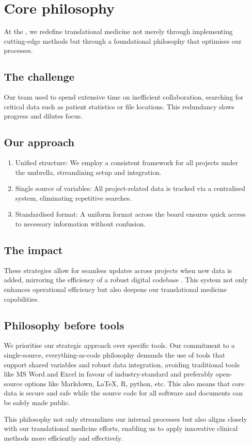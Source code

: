 \section{Core philosophy}
At the \pmu, we redefine translational medicine not merely through implementing cutting-edge methods but through a foundational philosophy that optimises our processes.


\subsection*{The challenge}
Our team used to spend extensive time on inefficient collaboration, searching for critical data such as patient statistics or file locations.
This redundancy slows progress and dilutes focus.

\subsection*{Our approach}
\begin{enumerate}
\item  Unified structure: We employ a consistent framework for all projects under the \pmu umbrella, streamlining setup and integration.
\item Single source of variables: All project-related data is tracked via a centralised system, eliminating repetitive searches.
\item Standardised format: A uniform format across the board ensures quick access to necessary information without confusion.
\end{enumerate}

\subsection*{The impact}
These strategies allow for seamless updates across projects when new data is added, mirroring the efficiency of a robust digital codebase 
\citep{potvin_levenberg_google_ACM}. 
This system not only enhances operational efficiency but also deepens our translational medicine capabilities.

\subsection*{Philosophy before tools}
We prioritise our strategic approach over specific tools. 
Our commitment to a single-source, everything-as-code philosophy demands the use of tools that support shared variables and robust data integration, avoiding traditional tools like MS Word and Excel in favour of industry-standard and preferably open-source options like Markdown, LaTeX, R, python, etc.
This also means that core data is secure and safe while the source code for all software and documents can be safely made public.

This philosophy not only streamlines our internal processes but also aligns closely with our translational medicine efforts, enabling us to apply innovative clinical methods more efficiently and effectively.
